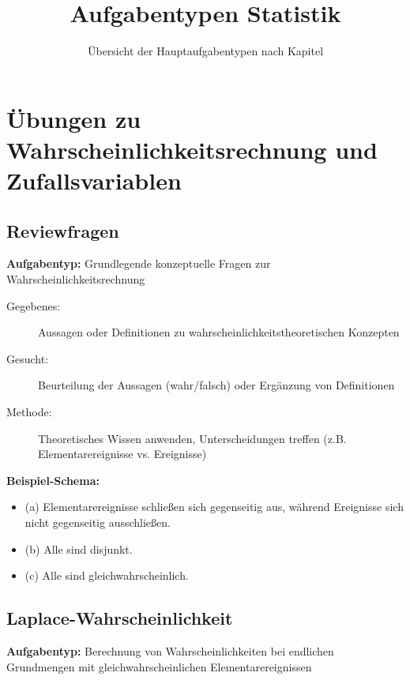 \documentclass[12pt, a4paper, titlepage, ngerman]{scrartcl}
\title{Aufgabentypen Statistik}
\subtitle{Übersicht der Hauptaufgabentypen nach Kapitel}
\author{}
\date{}
\begin{document}
\maketitle

\tableofcontents

\newpage

\section{Übungen zu Wahrscheinlichkeitsrechnung und Zufallsvariablen}

\subsection{Reviewfragen}

\textbf{Aufgabentyp:} Grundlegende konzeptuelle Fragen zur Wahrscheinlichkeitsrechnung

\begin{description}
  \item[Gegebenes:] Aussagen oder Definitionen zu wahrscheinlichkeitstheoretischen Konzepten
  \item[Gesucht:] Beurteilung der Aussagen (wahr/falsch) oder Ergänzung von Definitionen
  \item[Methode:] Theoretisches Wissen anwenden, Unterscheidungen treffen (z.B. Elementarereignisse vs. Ereignisse)
\end{description}

\medskip

\textbf{Beispiel-Schema:}
\begin{itemize}
  \item (a) Elementarereignisse schließen sich gegenseitig aus, während Ereignisse sich nicht gegenseitig ausschließen.
  \item (b) Alle sind disjunkt.
  \item (c) Alle sind gleichwahrscheinlich.
\end{itemize}

\subsection{Laplace-Wahrscheinlichkeit}

\textbf{Aufgabentyp:} Berechnung von Wahrscheinlichkeiten bei endlichen Grundmengen mit gleichwahrscheinlichen Elementarereignissen
\end{document}
